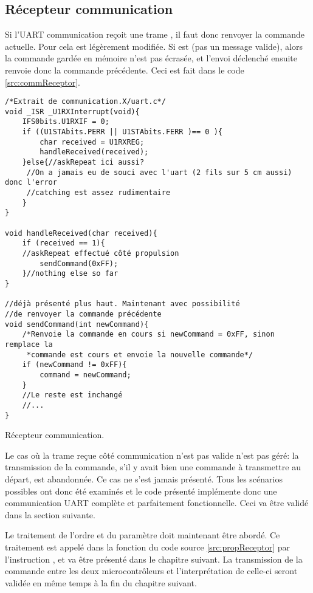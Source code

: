 \subsection{Récepteur communication}
Si l'UART communication reçoit une trame , il faut donc renvoyer la commande actuelle. Pour cela  est légèrement modifiée. Si  est  (pas un message valide), alors la commande gardée en mémoire n'est pas écrasée, et l'envoi déclenché ensuite renvoie donc la commande précédente. Ceci est fait dans le code \ref{src:commReceptor}.
\begin{listing}[htbp]
\begin{verbatim}
/*Extrait de communication.X/uart.c*/
void _ISR _U1RXInterrupt(void){
    IFS0bits.U1RXIF = 0;
    if ((U1STAbits.PERR || U1STAbits.FERR )== 0 ){
        char received = U1RXREG;
        handleReceived(received);
    }else{//askRepeat ici aussi?
     //On a jamais eu de souci avec l'uart (2 fils sur 5 cm aussi) donc l'error
     //catching est assez rudimentaire
    }
}

void handleReceived(char received){
    if (received == 1){
    //askRepeat effectué côté propulsion
        sendCommand(0xFF);
    }//nothing else so far
}

//déjà présenté plus haut. Maintenant avec possibilité
//de renvoyer la commande précédente
void sendCommand(int newCommand){
    /*Renvoie la commande en cours si newCommand = 0xFF, sinon remplace la
     *commande est cours et envoie la nouvelle commande*/
    if (newCommand != 0xFF){
        command = newCommand;
    }
    //Le reste est inchangé
    //...
}
\end{verbatim}
\caption{Récepteur communication.\label{src:commReceptor}}
\end{listing}
Le cas où la trame reçue côté communication n'est pas valide n'est pas géré: la transmission de la commande, s'il y avait bien une commande à transmettre au départ, est abandonnée. Ce cas ne s'est jamais présenté. Tous les scénarios possibles ont donc été examinés et le code présenté implémente donc une communication UART complète et parfaitement fonctionnelle. Ceci va être validé dans la section suivante.

Le traitement de l'ordre et du paramètre doit maintenant être abordé. Ce traitement est appelé dans la fonction  du code source \ref{src:propReceptor} par l'instruction , et va être présenté dans le chapitre suivant. La transmission de la commande entre les deux microcontrôleurs et l'interprétation de celle-ci seront validée en même temps à la fin du chapitre suivant.